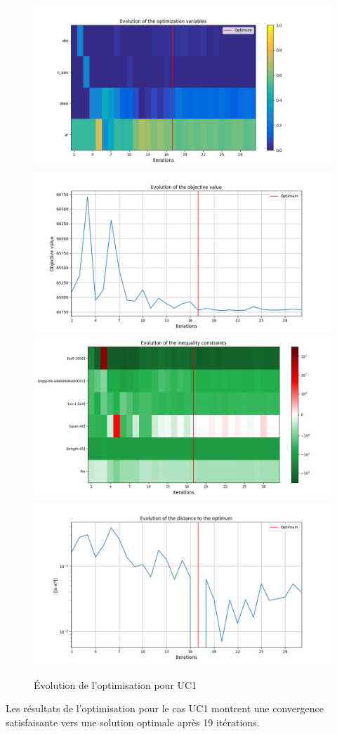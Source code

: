 \documentclass[a4paper, 11pt]{article}
\begin{document}
\begin{figure}[H]
    \centering
    \includegraphics[width=0.49\linewidth]{Images_case_1/p1u1_evol_optim_variables2.png}
    \includegraphics[width=0.49\linewidth]{Images_case_1/p1u1_evol_obj_val2.png}
    \includegraphics[width=0.49\linewidth]{Images_case_1/p1u1_evol_ineq_const2.png}
    \includegraphics[width=0.49\linewidth]{Images_case_1/p1u1_evol_dist_to_opt2.png}
    \caption{Évolution de l'optimisation pour UC1}
    \label{fig:pu1u1optim}
\end{figure}

Les résultats de l'optimisation pour le cas UC1 montrent une convergence satisfaisante vers une solution optimale après 19 itérations.
\end{document}
